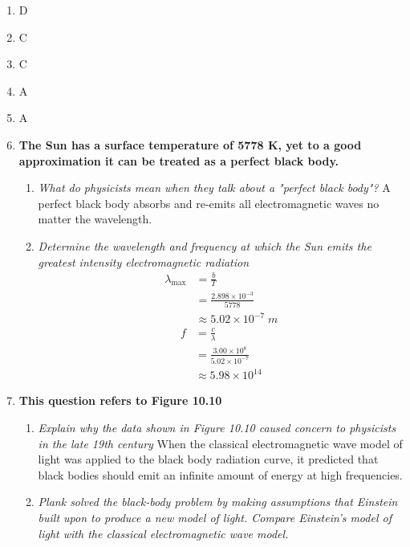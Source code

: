 \documentclass{report}
\begin{document}
		\begin{enumerate}
			\item D
			\item C
			\item C
			\item A
			\item A
			\item \textbf{The Sun has a surface temperature of 5778 K, yet to a good approximation it can be treated as a perfect black body.}
				\begin{enumerate}
					\item \textit{What do physicists mean when they talk about a "perfect black body"?}
						\subitem A perfect black body absorbs and re-emits all electromagnetic waves no matter the wavelength.

					\item \textit{Determine the wavelength and frequency at which the Sun emits the greatest intensity electromagnetic radiation}
						\begin{align*}
							\lambda_\text{max} &= \frac{b}{T} \\
									   &= \frac{2.898 \times 10^{-3}}{5778} \\
									   &\approx 5.02 \times 10^{-7} \; m
						\end{align*}
						\begin{align*}
							f &= \frac{c}{\lambda} \\
							  &= \frac{3.00 \times 10^8}{5.02 \times 10^{-7}} \\
							  &\approx 5.98 \times 10^{14}
						\end{align*}
				\end{enumerate}

			\item \textbf{This question refers to Figure 10.10}

				\begin{enumerate}
					\item \textit{Explain why the data shown in Figure 10.10 caused concern to physicists in the late 19th century}
						\subitem When the classical electromagnetic wave model of light was applied to the black body radiation curve, it predicted that black bodies should emit an infinite amount of energy at high frequencies.

					\item \textit{Plank solved the black-body problem by making assumptions that Einstein built upon to produce a new model of light. Compare Einstein's model of light with the classical electromagnetic wave model.}
						\subitem
				\end{enumerate}
		\end{enumerate}
	
\end{document}
